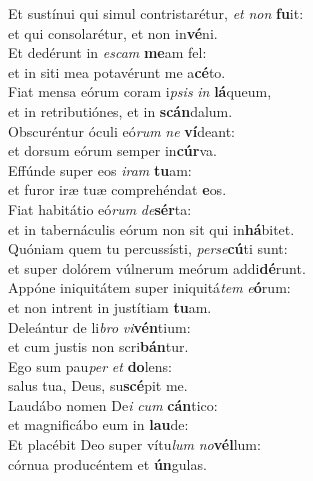 \oddverse Et sustínui qui simul contristarétur, \textit{et} \textit{non} \textbf{fu}it:~\*\\
\oddverse et qui consolarétur, et non in\textbf{vé}ni.\\
\evenverse Et dedérunt in \textit{e}\textit{scam} \textbf{me}am fel:~\*\\
\evenverse et in siti mea potavérunt me a\textbf{cé}to.\\
\oddverse Fiat mensa eórum coram i\textit{psis} \textit{in} \textbf{lá}queum,~\*\\
\oddverse et in retributiónes, et in \textbf{scán}dalum.\\
\evenverse Obscuréntur óculi eó\textit{rum} \textit{ne} \textbf{ví}deant:~\*\\
\evenverse et dorsum eórum semper in\textbf{cúr}va.\\
\oddverse Effúnde super eos \textit{i}\textit{ram} \textbf{tu}am:~\*\\
\oddverse et furor iræ tuæ comprehéndat \textbf{e}os.\\
\evenverse Fiat habitátio eó\textit{rum} \textit{de}\textbf{sér}ta:~\*\\
\evenverse et in tabernáculis eórum non sit qui in\textbf{há}bitet.\\
\oddverse Quóniam quem tu percussísti, \textit{per}\textit{se}\textbf{cú}ti sunt:~\*\\
\oddverse et super dolórem vúlnerum meórum addi\textbf{dé}runt.\\
\evenverse Appóne iniquitátem super iniquitá\textit{tem} \textit{e}\textbf{ó}rum:~\*\\
\evenverse et non intrent in justítiam \textbf{tu}am.\\
\oddverse Deleántur de li\textit{bro} \textit{vi}\textbf{vén}tium:~\*\\
\oddverse et cum justis non scri\textbf{bán}tur.\\
\evenverse Ego sum pau\textit{per} \textit{et} \textbf{do}lens:~\*\\
\evenverse salus tua, Deus, su\textbf{scé}pit me.\\
\oddverse Laudábo nomen De\textit{i} \textit{cum} \textbf{cán}tico:~\*\\
\oddverse et magnificábo eum in \textbf{lau}de:\\
\evenverse Et placébit Deo super vítu\textit{lum} \textit{no}\textbf{vél}lum:~\*\\
\evenverse córnua producéntem et \textbf{ún}gulas.\\
